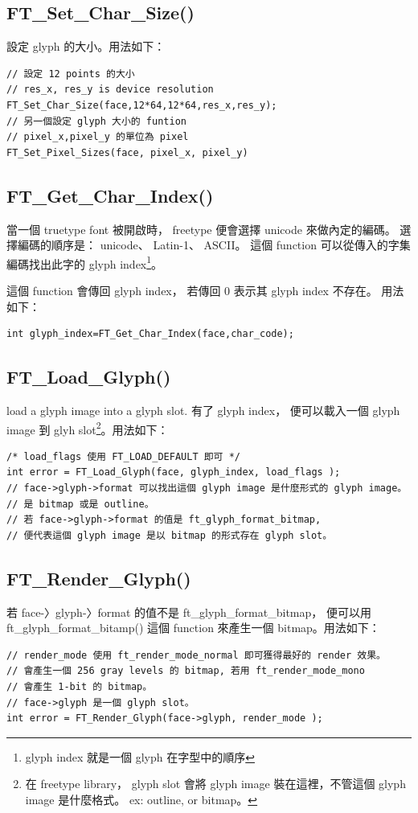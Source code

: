 \documentclass[12pt,a4]{article}
\begin{document}
\begin{CJK}{UTF8}{cwmu}
\subsection{FT\_{}Set\_{}Char\_{}Size()}
設定 glyph 的大小。用法如下：
\begin{Verbatim}[commandchars=@\[\]]
// 設定 12 points 的大小
// res_x, res_y is device resolution
FT_Set_Char_Size(face,12*64,12*64,res_x,res_y);
// 另一個設定 glyph 大小的 funtion
// pixel_x,pixel_y 的單位為 pixel
FT_Set_Pixel_Sizes(face, pixel_x, pixel_y)
\end{Verbatim}
\subsection{FT\_{}Get\_{}Char\_{}Index()}
當一個 truetype font 被開啟時， freetype 便會選擇 unicode 來做內定的編碼。
選擇編碼的順序是： unicode、 Latin-1、 ASCII。
這個 function 可以從傳入的字集編碼找出此字的 glyph index\footnote{glyph index 就是一個 glyph 在字型中的順序}。

這個 function 會傳回 glyph index， 若傳回 0 表示其 glyph index 不存在。 用法如下：
\begin{Verbatim}[commandchars=@\[\]]
int glyph_index=FT_Get_Char_Index(face,char_code);
\end{Verbatim}
\subsection{FT\_{}Load\_{}Glyph()}
load a glyph image into a glyph slot. 有了 glyph index， 便可以載入一個 glyph image 到 glyh slot\footnote{在 freetype library， glyph slot 會將 glyph image 裝在這裡，不管這個 glyph image 是什麼格式。 ex: outline, or bitmap。}。用法如下：
\begin{Verbatim}[commandchars=@\[\]]
/* load_flags 使用 FT_LOAD_DEFAULT 即可 */
int error = FT_Load_Glyph(face, glyph_index, load_flags );  
// face->glyph->format 可以找出這個 glyph image 是什麼形式的 glyph image。
// 是 bitmap 或是 outline。
// 若 face->glyph->format 的值是 ft_glyph_format_bitmap,
// 便代表這個 glyph image 是以 bitmap 的形式存在 glyph slot。
\end{Verbatim}
\subsection{FT\_{}Render\_{}Glyph()}
若 face-〉glyph-〉format 的值不是  ft\_{}glyph\_{}format\_{}bitmap， 便可以用  
ft\_{}glyph\_{}format\_{}bitamp() 這個 function 來產生一個 bitmap。用法如下：
\begin{Verbatim}[commandchars=@\[\]]
// render_mode 使用 ft_render_mode_normal 即可獲得最好的 render 效果。
// 會產生一個 256 gray levels 的 bitmap, 若用 ft_render_mode_mono
// 會產生 1-bit 的 bitmap。
// face->glyph 是一個 glyph slot。
int error = FT_Render_Glyph(face->glyph, render_mode );
\end{Verbatim}
\newpage

\end{CJK}
\end{document}
